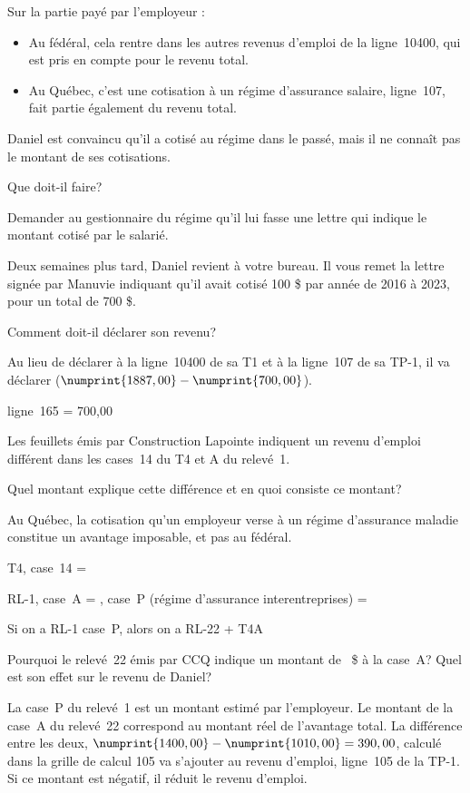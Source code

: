 Sur la partie payé par l'employeur :
\begin{itemize}
	\item Au fédéral, cela rentre dans les autres revenus d'emploi de la ligne~10400, qui est pris en compte pour le revenu total.
	\item Au Québec, c'est une cotisation à un régime d'assurance salaire, ligne~107, fait partie également du revenu total.
\end{itemize}

\begin{question}
	Daniel est convaincu qu'il a cotisé au régime dans le passé, mais il ne connaît pas le montant de ses cotisations. 
	
	Que doit-il faire?
\end{question}
Demander au gestionnaire du régime qu'il lui fasse une lettre qui indique le montant cotisé par le salarié.

\begin{question}
	Deux semaines plus tard, Daniel revient à votre bureau. Il vous remet la lettre signée par Manuvie indiquant qu'il avait cotisé 100 \$ par année de 2016 à 2023, pour un total de 700 \$.
	
	Comment doit-il déclarer son revenu?
\end{question}
Au lieu de déclarer  à la ligne~10400 de sa T1 et à la ligne~107 de sa TP-1, il va déclarer  ($\numprint{1887,00} - \numprint{700,00}$).

ligne~165 = 700,00

\begin{question}
	Les feuillets émis par Construction Lapointe indiquent un revenu d'emploi différent dans les cases~14 du T4 et A du relevé~1. 
	
	Quel montant explique cette différence et en quoi consiste ce montant?
\end{question}
Au Québec, la cotisation qu'un employeur verse à un régime d'assurance maladie constitue un avantage imposable, et pas au fédéral.

T4, case~14 = 

RL-1, case~A = , case~P (régime d'assurance interentreprises) =  

Si on a RL-1 case~P, alors on a RL-22 + T4A

\begin{question}
	Pourquoi le relevé~22 émis par CCQ indique un montant de ~\$ à la case~A? Quel est son effet sur le revenu de Daniel?
\end{question}
La case~P du relevé~1 est un montant estimé par l'employeur. Le montant de la case~A du relevé~22 correspond  au montant réel de l'avantage total. La différence entre les deux, $\numprint{1400,00} - \numprint{1010,00} = 390,00$, calculé dans la grille de calcul 105 va s'ajouter au revenu d'emploi, ligne~105 de la TP-1. Si ce montant est négatif, il réduit le revenu d'emploi.

